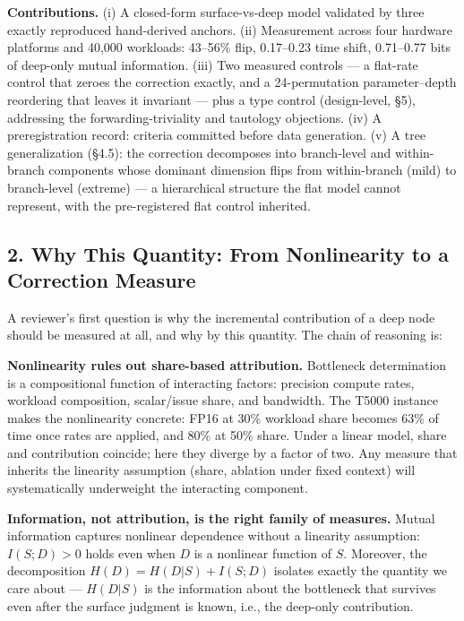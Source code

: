 \textbf{Contributions.} (i) A closed-form surface-vs-deep model validated by three exactly reproduced hand-derived anchors. (ii) Measurement across four hardware platforms and 40,000 workloads: 43--56\% flip, 0.17--0.23 time shift, 0.71--0.77 bits of deep-only mutual information. (iii) Two measured controls --- a flat-rate control that zeroes the correction exactly, and a 24-permutation parameter--depth reordering that leaves it invariant --- plus a type control (design-level, §5), addressing the forwarding-triviality and tautology objections. (iv) A preregistration record: criteria committed before data generation. (v) A tree generalization (§4.5): the correction decomposes into branch-level and within-branch components whose dominant dimension flips from within-branch (mild) to branch-level (extreme) --- a hierarchical structure the flat model cannot represent, with the pre-registered flat control inherited.

\subsection{2. Why This Quantity: From Nonlinearity to a Correction Measure}\label{why-this-quantity-from-nonlinearity-to-a-correction-measure}

A reviewer's first question is why the incremental contribution of a deep node should be measured at all, and why by this quantity. The chain of reasoning is:

\textbf{Nonlinearity rules out share-based attribution.} Bottleneck determination is a compositional function of interacting factors: precision compute rates, workload composition, scalar/issue share, and bandwidth. The T5000 instance makes the nonlinearity concrete: FP16 at 30\% workload share becomes 63\% of time once rates are applied, and 80\% at 50\% share. Under a linear model, share and contribution coincide; here they diverge by a factor of two. Any measure that inherits the linearity assumption (share, ablation under fixed context) will systematically underweight the interacting component.

\textbf{Information, not attribution, is the right family of measures.} Mutual information captures nonlinear dependence without a linearity assumption: \(I(S;D) > 0\) holds even when \(D\) is a nonlinear function of \(S\). Moreover, the decomposition \(H(D) = H(D|S) + I(S;D)\) isolates exactly the quantity we care about --- \(H(D|S)\) is the information about the bottleneck that survives even after the surface judgment is known, i.e., the deep-only contribution.

